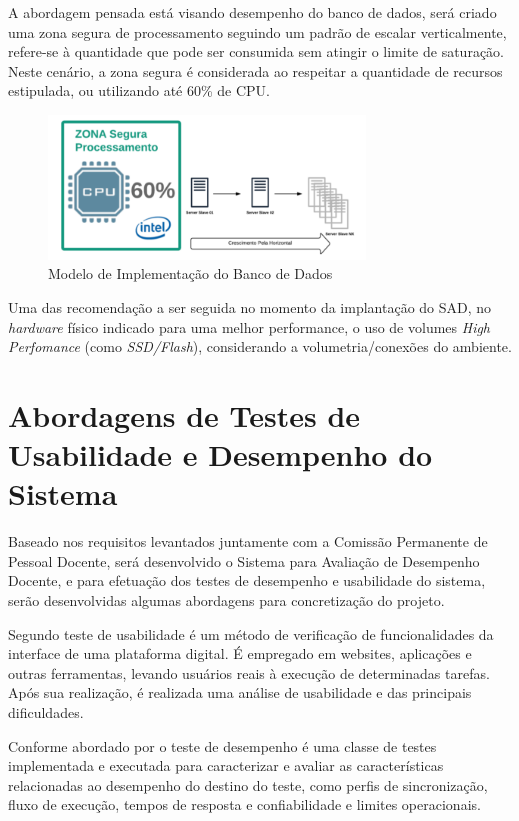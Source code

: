     A abordagem pensada está visando desempenho do banco de dados, será criado uma zona segura de processamento seguindo um padrão de escalar verticalmente, refere-se à quantidade que pode ser consumida sem atingir o limite de saturação. Neste cenário, a zona segura é considerada ao respeitar a quantidade de recursos estipulada, ou utilizando até 60\% de CPU.
   
    \begin{figure}[h]
    \centering
    \includegraphics[width=0.75\textwidth]{./img/segProc.png}
    \caption{Modelo de Implementação do Banco de Dados }
    \label{fig:segProc}
    \end{figure}

    Uma das recomendação a ser seguida no momento da implantação do SAD, no \textit{hardware} físico indicado para uma melhor performance, o uso de volumes \textit{High Perfomance} (como \textit{SSD/Flash}), considerando a volumetria/conexões do ambiente.    
    
    
\section{Abordagens de Testes de Usabilidade e Desempenho do Sistema}

    Baseado nos requisitos levantados juntamente com a Comissão Permanente de Pessoal Docente, será desenvolvido o Sistema para Avaliação de Desempenho Docente, e para efetuação dos testes de desempenho e usabilidade do sistema, serão desenvolvidas algumas abordagens para concretização do projeto.
    
    Segundo  teste de usabilidade é um método de verificação de funcionalidades da interface de uma plataforma digital. É empregado em websites, aplicações e outras ferramentas, levando usuários reais à execução de determinadas tarefas. Após sua realização, é realizada uma análise de usabilidade e das principais dificuldades.
    
    Conforme abordado por  o teste de desempenho é uma classe de testes implementada e executada para caracterizar e avaliar as características relacionadas ao desempenho do destino do teste, como perfis de sincronização, fluxo de execução, tempos de resposta e confiabilidade e limites operacionais. 
    
